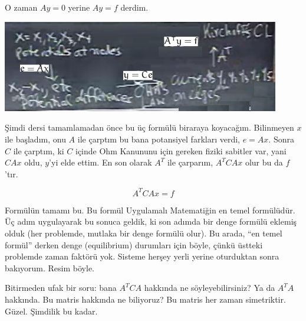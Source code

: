 \documentclass[12pt,fleqn]{article}\usepackage{../../common}
\begin{document}
O zaman  $Ay=0$ yerine $Ay=f$ derdim. 

\includegraphics[height=4cm]{12_10.png}

Şimdi dersi tamamlamadan önce bu üç formülü biraraya koyacağım. Bilinmeyen
$x$ ile başladım, onu $A$ ile çarptım bu bana potansiyel farkları verdi,
$e=Ax$. Sonra $C$ ile çarptım, ki $C$ içinde Ohm Kanununu için gereken
fiziki sabitler var, yani $CAx$ oldu, $y$'yi elde ettim. En son olarak
$A^T$ ile çarparım, $A^TCAx$ olur bu da $f$'tır. 

$$ A^TCAx = f $$

Formülün tamamı bu. Bu formül Uygulamalı Matematiğin en temel
formülüdür. Üç adım uygulayarak bu sonuca geldik, ki son adımda bir denge
formülü eklemiş olduk (her problemde, mutlaka bir denge formülü olur). Bu
arada, ``en temel formül'' derken denge (equilibrium) durumları için böyle,
çünkü üstteki problemde zaman faktörü yok. Sisteme herşey yerli yerine
oturduktan sonra bakıyorum. Resim böyle.

Bitirmeden ufak bir soru: bana $A^TCA$ hakkında ne söyleyebilirsiniz? Ya da
$A^TA$ hakkında. Bu matris hakkında ne biliyoruz? Bu matris her zaman
simetriktir. Güzel. Şimdilik bu kadar.
\end{document}
